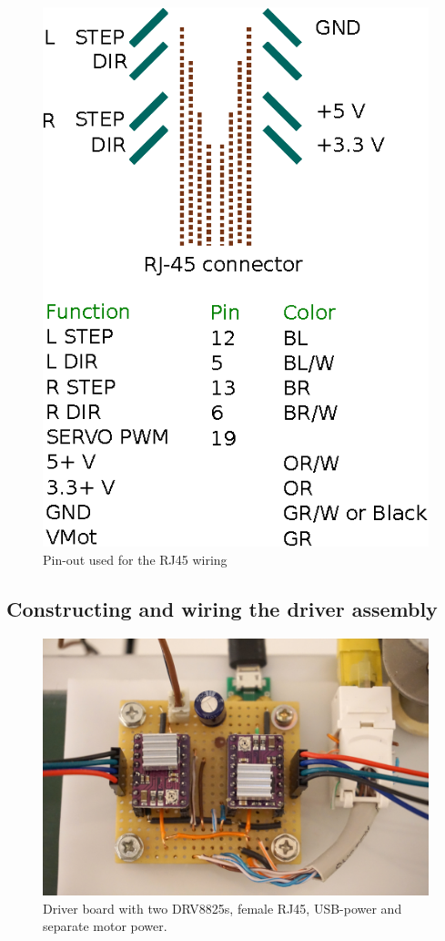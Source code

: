 \documentclass[a4paper,10pt]{article}
\begin{document}
\begin{figure}[h!]
  \centering
  \includegraphics[scale=.75]{img/pinout.eps}
  \caption{Pin-out used for the RJ45 wiring}
  \label{fig:pinout}
\end{figure}

\subsection{Constructing and wiring the driver assembly}

\begin{figure}[h!]
  \centering
  \includegraphics{img/driverboard.jpg}
  \caption{Driver board with two DRV8825s, female RJ45, USB-power and separate motor power.}
  \label{fig:driverboard}
\end{figure}
\end{document}
